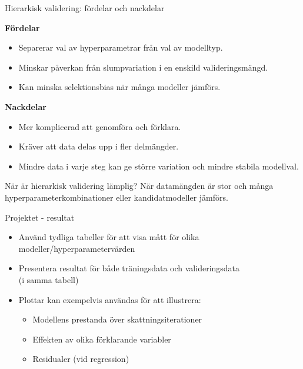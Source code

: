 \documentclass[10pt,english]{beamer}
\begin{document}
\begin{frame}{Hierarkisk validering: fördelar och nackdelar}

\textbf{Fördelar}
\begin{itemize}
    \item Separerar val av hyperparametrar från val av modelltyp.
    \item Minskar påverkan från slumpvariation i en enskild
          valideringsmängd.
    \item Kan minska selektionsbias när många modeller jämförs.
\end{itemize}

\vspace{0.2cm}

\textbf{Nackdelar}
\begin{itemize}
    \item Mer komplicerad att genomföra och förklara.
    \item Kräver att data delas upp i fler delmängder.
    \item Mindre data i varje steg kan ge större variation och
          mindre stabila modellval.
\end{itemize}

\vspace{0.2cm}

\begin{block}{När är hierarkisk validering lämplig?}
När datamängden är stor och många hyperparameterkombinationer eller
kandidatmodeller jämförs.
\end{block}

\end{frame}






\begin{frame}{Projektet - resultat}
\begin{itemize}
    \item Använd tydliga tabeller för att visa mått för olika modeller/hyperparametervärden
    \item Presentera resultat för både träningsdata och valideringsdata \\ (i samma tabell)
    \item Plottar kan exempelvis användas för att illustrera:
    \begin{itemize}
        \item Modellens prestanda över skattningsiterationer
        \item Effekten av olika förklarande variabler
        \item Residualer (vid regression)
    \end{itemize}
\end{itemize}
\end{frame}
\end{document}
